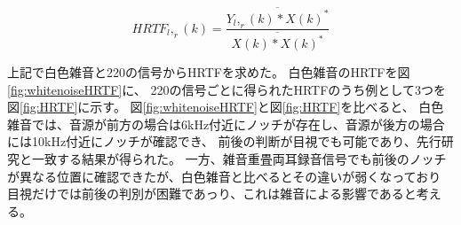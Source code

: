 \documentclass[autodetect-engine,12pt,titlepagedvi=dvipdfmx,ja=standard]{bxjsreport}
\begin{document}
\begin{equation}
     HRTF_l,_r(k) = \frac{\overline{ Y_l,_r(k)*X(k)^{*} }}{ \overline{ X(k)*X(k)^{*} }}\label{formula:HRTF}
\end{equation}


  上記で白色雑音と220の信号からHRTFを求めた。
  白色雑音のHRTFを図\ref{fig:whitenoiseHRTF}に、
  220の信号ごとに得られたHRTFのうち例として3つを図\ref{fig:HRTF}に示す。
  図\ref{fig:whitenoiseHRTF}と図\ref{fig:HRTF}を比べると、
  白色雑音では、音源が前方の場合は6kHz付近にノッチが存在し、音源が後方の場合には10kHz付近にノッチが確認でき、
  前後の判断が目視でも可能であり、先行研究\cite{K}と一致する結果が得られた。 
  一方、雑音重畳両耳録音信号でも前後のノッチが異なる位置に確認できたが、白色雑音と比べるとその違いが弱くなっており
  目視だけでは前後の判別が困難であっり、これは雑音による影響であると考える。
  
  

\clearpage
\end{document}
